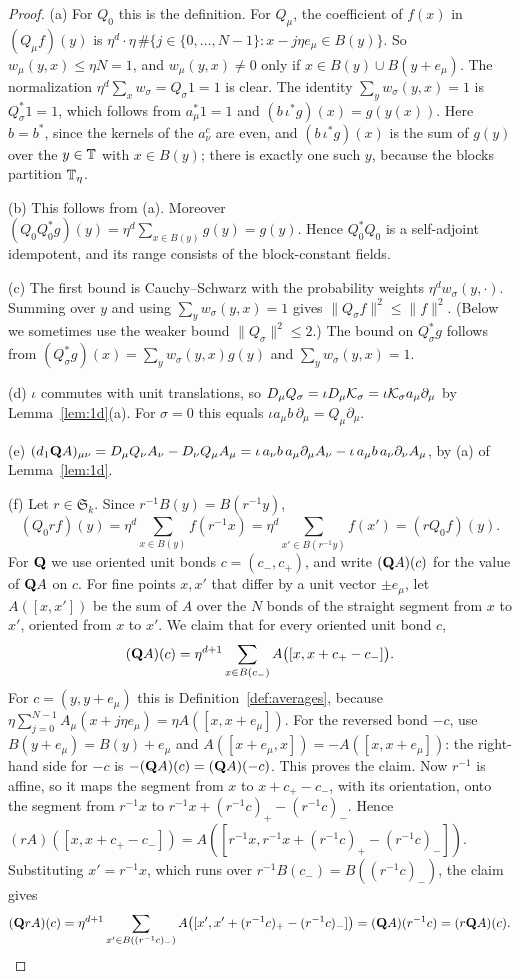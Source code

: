 \begin{proof}
(a) For $Q_0$ this is the definition. For $Q_\mu$, the coefficient of $f(x)$ in $(Q_\mu f)(y)$ is $\eta^{d}\cdot\eta\,\#\{j\in\{0,\dots,N-1\}:x-j\eta e_\mu\in B(y)\}$. So $w_\mu(y,x)\le\eta N=1$, and $w_\mu(y,x)\neq0$ only if $x\in B(y)\cup B(y+e_\mu)$. The normalization $\eta^d\sum_xw_\sigma=Q_\sigma1=1$ is clear. The identity $\sum_yw_\sigma(y,x)=1$ is $Q_\sigma^*1=1$, which follows from $a_\mu^*1=1$ and $(b\,\iota^*g)(x)=g(y(x))$. Here $b=b^*$, since the kernels of the $a^c_\nu$ are even, and $(b\,\iota^*g)(x)$ is the sum of $g(y)$ over the $y\in\mathbb T$ with $x\in B(y)$; there is exactly one such $y$, because the blocks partition $\mathbb T_\eta$.

(b) This follows from (a). Moreover $(Q_0Q_0^*g)(y)=\eta^d\sum_{x\in B(y)}g(y)=g(y)$. Hence $Q_0^*Q_0$ is a self-adjoint idempotent, and its range consists of the block-constant fields.

(c) The first bound is Cauchy--Schwarz with the probability weights $\eta^dw_\sigma(y,\cdot)$. Summing over $y$ and using $\sum_yw_\sigma(y,x)=1$ gives $\|Q_\sigma f\|^2\le\|f\|^2$. (Below we sometimes use the weaker bound $\|Q_\sigma\|^2\le2$.) The bound on $Q_\sigma^*g$ follows from $(Q_\sigma^*g)(x)=\sum_yw_\sigma(y,x)g(y)$ and $\sum_yw_\sigma(y,x)=1$.

(d) $\iota$ commutes with unit translations, so $D_\mu Q_\sigma=\iota D_\mu\mathcal K_\sigma=\iota\mathcal K_\sigma a_\mu\partial_\mu$ by Lemma~\ref{lem:1d}(a). For $\sigma=0$ this equals $\iota a_\mu b\,\partial_\mu=Q_\mu\partial_\mu$.

(e) $(d_1\mathbf Q A)_{\mu\nu}=D_\mu Q_\nu A_\nu-D_\nu Q_\mu A_\mu=\iota\,a_\nu b\,a_\mu\partial_\mu A_\nu-\iota\,a_\mu b\,a_\nu\partial_\nu A_\mu$, by (a) of Lemma~\ref{lem:1d}.

(f) Let $r\in\mathfrak S_k$. Since $r^{-1}B(y)=B(r^{-1}y)$,
\[
(Q_0rf)(y)=\eta^d\sum_{x\in B(y)}f(r^{-1}x)=\eta^d\sum_{x'\in B(r^{-1}y)}f(x')=(rQ_0f)(y).
\]
For $\mathbf Q$ we use oriented unit bonds $c=(c_-,c_+)$, and write $(\mathbf Q A)(c)$ for the value of $\mathbf Q A$ on $c$. For fine points $x,x'$ that differ by a unit vector $\pm e_\mu$, let $A([x,x'])$ be the sum of $A$ over the $N$ bonds of the straight segment from $x$ to $x'$, oriented from $x$ to $x'$. We claim that for every oriented unit bond $c$,
\[
(\mathbf Q A)(c)=\eta^{d+1}\sum_{x\in B(c_-)}A\big([x,x+c_+-c_-]\big).
\]
For $c=(y,y+e_\mu)$ this is Definition~\ref{def:averages}, because $\eta\sum_{j=0}^{N-1}A_\mu(x+j\eta e_\mu)=\eta A([x,x+e_\mu])$. For the reversed bond $-c$, use $B(y+e_\mu)=B(y)+e_\mu$ and $A([x+e_\mu,x])=-A([x,x+e_\mu])$: the right-hand side for $-c$ is $-(\mathbf Q A)(c)=(\mathbf Q A)(-c)$. This proves the claim. Now $r^{-1}$ is affine, so it maps the segment from $x$ to $x+c_+-c_-$, with its orientation, onto the segment from $r^{-1}x$ to $r^{-1}x+(r^{-1}c)_+-(r^{-1}c)_-$. Hence $(rA)([x,x+c_+-c_-])=A([r^{-1}x,r^{-1}x+(r^{-1}c)_+-(r^{-1}c)_-])$. Substituting $x'=r^{-1}x$, which runs over $r^{-1}B(c_-)=B((r^{-1}c)_-)$, the claim gives
\[
(\mathbf Q rA)(c)=\eta^{d+1}\sum_{x'\in B((r^{-1}c)_-)}A\big([x',x'+(r^{-1}c)_+-(r^{-1}c)_-]\big)=(\mathbf Q A)(r^{-1}c)=(r\mathbf Q A)(c).\qedhere
\]
\end{proof}

